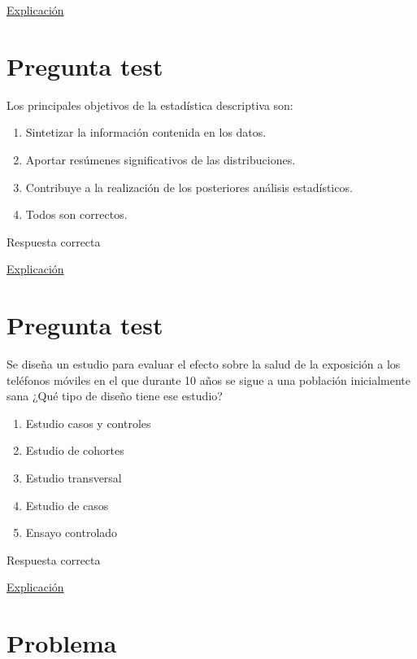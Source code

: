 \documentclass[
]{book}
\providecommand{\tightlist}{%
  \setlength{\itemsep}{0pt}\setlength{\parskip}{0pt}}
\begin{document}
\href{https://1fjmanzano.github.io/bioestadistica/conceptos-previos.html}{Explicación}

\hypertarget{pregunta-test-38}{%
\section{Pregunta test}\label{pregunta-test-38}}

Los principales objetivos de la estadística descriptiva son:

\begin{enumerate}
\def\labelenumi{\alph{enumi})}
\tightlist
\item
  Sintetizar la información contenida en los datos.
\item
  Aportar resúmenes significativos de las distribuciones.
\item
  Contribuye a la realización de los posteriores análisis estadísticos.
\item
  Todos son correctos.
\end{enumerate}

Respuesta correcta

\href{https://1fjmanzano.github.io/bioestadistica/an\%C3\%A1lisis-exploratorio-de-datos.html}{Explicación}

\hypertarget{pregunta-test-39}{%
\section{Pregunta test}\label{pregunta-test-39}}

Se diseña un estudio para evaluar el efecto sobre la salud de la exposición a los teléfonos móviles en el que durante 10 años se sigue a una población inicialmente sana ¿Qué tipo de diseño tiene ese estudio?

\begin{enumerate}
\def\labelenumi{\alph{enumi})}
\tightlist
\item
  Estudio casos y controles
\item
  Estudio de cohortes
\item
  Estudio transversal
\item
  Estudio de casos
\item
  Ensayo controlado
\end{enumerate}

Respuesta correcta

\href{https://es.wikipedia.org/wiki/Estudio_de_cohorte}{Explicación}

\hypertarget{problema-6}{%
\section{Problema}\label{problema-6}}
\end{document}
